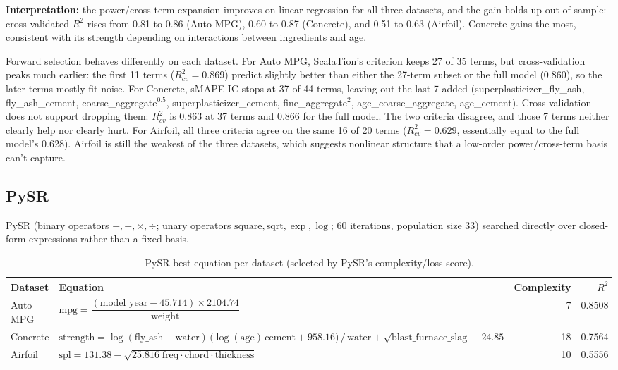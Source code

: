 \documentclass[11pt]{article}
\begin{document}
\textbf{Interpretation:} the power/cross-term expansion improves on linear
regression for all three datasets, and the gain holds up out of sample: cross-validated $R^2$ rises from 0.81 to 0.86 (Auto MPG), 0.60 to
0.87 (Concrete), and 0.51 to 0.63 (Airfoil). Concrete gains the most,
consistent with its strength depending on interactions between ingredients
and age.

Forward selection behaves differently on each dataset. For Auto MPG,
ScalaTion's criterion keeps 27 of 35 terms, but cross-validation peaks much
earlier: the first 11 terms ($R^2_{cv}=0.869$) predict slightly better than
either the 27-term subset or the full model (0.860), so the later terms mostly
fit noise. For Concrete, sMAPE-IC stops at 37 of
44 terms, leaving out the last 7 added (superplasticizer\_fly\_ash,
fly\_ash\_cement, coarse\_aggregate$^{0.5}$, superplasticizer\_cement,
fine\_aggregate$^2$, age\_coarse\_aggregate, age\_cement). Cross-validation
does not support dropping them: $R^2_{cv}$ is 0.863 at 37 terms and 0.866 for
the full model. The two criteria disagree, and those 7 terms neither clearly
help nor clearly hurt. For Airfoil, all three criteria agree on the same 16
of 20 terms ($R^2_{cv}=0.629$, essentially equal to the full model's 0.628).
Airfoil is still the weakest of the three datasets, which suggests nonlinear
structure that a low-order power/cross-term basis can't capture.

\subsection{PySR}
\label{sec:pysr}
PySR (binary operators $+,-,\times,\div$; unary operators
$\mathrm{square}, \mathrm{sqrt}, \exp, \log$; 60 iterations, population size
33) searched directly over closed-form expressions rather than a fixed basis.

\begin{table}[H]
\centering
\caption{PySR best equation per dataset (selected by PySR's complexity/loss
score).}
\begin{tabular}{p{}p{}rr}
\toprule
Dataset & Equation & Complexity & $R^2$ \\
\midrule
Auto MPG & $\text{mpg} = \dfrac{(\text{model\_year} - 45.714)\times 2104.74}{\text{weight}}$ & 7 & 0.8508 \\[8pt]
Concrete & \raggedright $\text{strength} =\log(\text{fly\_ash}+\text{water})\,\bigl(\log(\text{age})\,\text{cement}+958.16\bigr)\,/\,\text{water} + \sqrt{\text{blast\_furnace\_slag}} - 24.85$ & 18 & 0.7564 \\[6pt]
Airfoil & $\text{spl} = 131.38 - \sqrt{25.816\;\text{freq}\cdot\text{chord}\cdot\text{thickness}}$ & 10 & 0.5556 \\
\bottomrule
\end{tabular}
\end{table}
\end{document}
